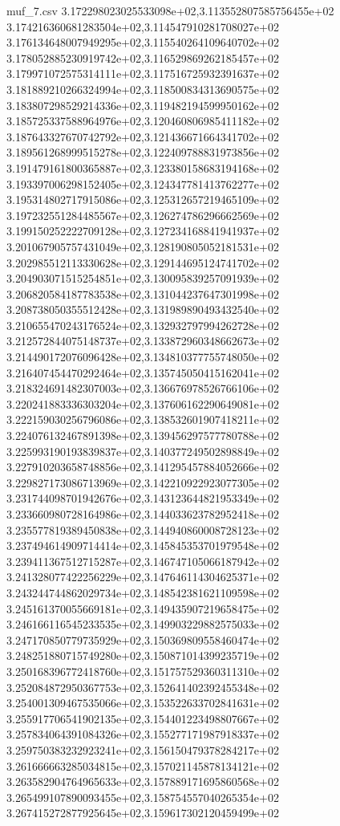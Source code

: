 \begin{filecontents*}{muf_7.csv}
3.172298023025533098e+02,3.113552807585756455e+02
3.174216360681283504e+02,3.114547910281708027e+02
3.176134648007949295e+02,3.115540264109640702e+02
3.178052885230919742e+02,3.116529869262185457e+02
3.179971072575314111e+02,3.117516725932391637e+02
3.181889210266324994e+02,3.118500834313690575e+02
3.183807298529214336e+02,3.119482194599950162e+02
3.185725337588964976e+02,3.120460806985411182e+02
3.187643327670742792e+02,3.121436671664341702e+02
3.189561268999515278e+02,3.122409788831973856e+02
3.191479161800365887e+02,3.123380158683194168e+02
3.193397006298152405e+02,3.124347781413762277e+02
3.195314802717915086e+02,3.125312657219465109e+02
3.197232551284485567e+02,3.126274786296662569e+02
3.199150252222709128e+02,3.127234168841941937e+02
3.201067905757431049e+02,3.128190805052181531e+02
3.202985512113330628e+02,3.129144695124741702e+02
3.204903071515254851e+02,3.130095839257091939e+02
3.206820584187783538e+02,3.131044237647301998e+02
3.208738050355512428e+02,3.131989890493432540e+02
3.210655470243176524e+02,3.132932797994262728e+02
3.212572844075148737e+02,3.133872960348662673e+02
3.214490172076096428e+02,3.134810377755748050e+02
3.216407454470292464e+02,3.135745050415162041e+02
3.218324691482307003e+02,3.136676978526766106e+02
3.220241883336303204e+02,3.137606162290649081e+02
3.222159030256796086e+02,3.138532601907418211e+02
3.224076132467891398e+02,3.139456297577780788e+02
3.225993190193839837e+02,3.140377249502898849e+02
3.227910203658748856e+02,3.141295457884052666e+02
3.229827173086713969e+02,3.142210922923077305e+02
3.231744098701942676e+02,3.143123644821953349e+02
3.233660980728164986e+02,3.144033623782952418e+02
3.235577819389450838e+02,3.144940860008728123e+02
3.237494614909714414e+02,3.145845353701979548e+02
3.239411367512715287e+02,3.146747105066187942e+02
3.241328077422256229e+02,3.147646114304625371e+02
3.243244744862029734e+02,3.148542381621109598e+02
3.245161370055669181e+02,3.149435907219658475e+02
3.246166116545233535e+02,3.149903229882575033e+02
3.247170850779735929e+02,3.150369809558460474e+02
3.248251880715749280e+02,3.150871014399235719e+02
3.250168396772418760e+02,3.151757529360311310e+02
3.252084872950367753e+02,3.152641402392455348e+02
3.254001309467535066e+02,3.153522633702841631e+02
3.255917706541902135e+02,3.154401223498807667e+02
3.257834064391084326e+02,3.155277171987918337e+02
3.259750383232923241e+02,3.156150479378284217e+02
3.261666663285034815e+02,3.157021145878134121e+02
3.263582904764965633e+02,3.157889171695860568e+02
3.265499107890093455e+02,3.158754557040265354e+02
3.267415272877925645e+02,3.159617302120459499e+02

\end{filecontents*}
